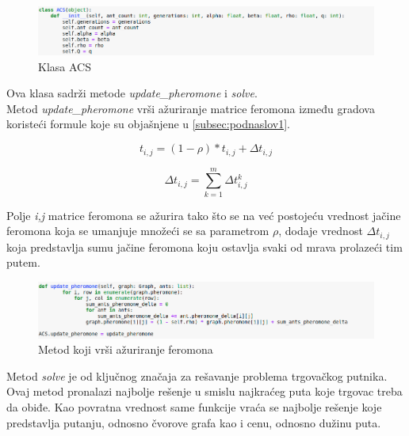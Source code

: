 \documentclass[a4paper]{article}
\begin{document}
\begin{figure}[h!]
\begin{center}
\includegraphics[width=1\columnwidth]{slika2.png}
\end{center}
\caption{Klasa ACS}
\label{fig:slika2}
\end{figure}


Ova klasa sadrži metode \textit{update\_pheromone} i \textit{solve}.\\
Metod \textit{update\_pheromone} vrši ažuriranje matrice feromona između gradova koristeći formule koje su objašnjene u \ref{subsec:podnaslov1}.


\begin{equation}
t_{i,j} = (1-\rho) * t_{i,j} + \Delta t_{i,j}
\end{equation}

\begin{equation}
\Delta t_{i,j}  = \sum_{k=1}^{m} \Delta t^k_{i,j}
\end{equation}

Polje \textit{i,j} matrice feromona se ažurira tako što se na već postojeću vrednost jačine feromona koja se umanjuje množeći se sa parametrom $\rho$, dodaje vrednost $\Delta t_{i,j}$ koja predstavlja sumu jačine feromona koju ostavlja svaki od mrava prolazeći tim putem.

\begin{figure}[h!]
\begin{center}
\includegraphics[width=1\columnwidth]{slika3.png}
\end{center}
\caption{Metod koji vrši ažuriranje feromona}
\label{fig:slika3}
\end{figure}


Metod \textit{solve} je od ključnog značaja za rešavanje problema trgovačkog putnika. Ovaj metod pronalazi najbolje rešenje u smislu najkraćeg puta koje trgovac treba da obiđe. Kao povratna vrednost same funkcije vraća se najbolje rešenje koje predstavlja putanju, odnosno čvorove grafa kao i cenu, odnosno dužinu puta. 
\end{document}
